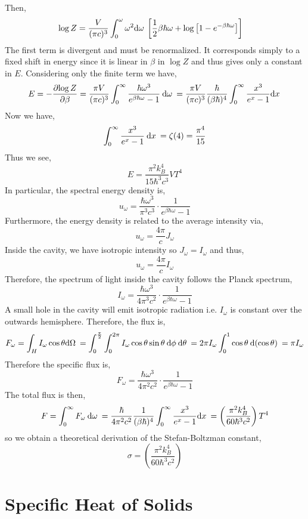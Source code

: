 \documentclass[12pt]{article}
\begin{document}
Then,
\begin{align*}
\log{Z} & = \frac{V}{(\pi c)^3} \int_0^\omega \omega^2 \mathrm{d}\omega \: \left[ \frac{1}{2} \beta \hbar \omega + \log{\left[1 - e^{-\beta \hbar \omega} \right]}  \right]
\end{align*}
The first term is divergent and must be renormalized. It corresponds simply to a fixed shift in energy since it is linear in $\beta$ in $\log{Z}$ and thus gives only a constant in $E$. Considering only the finite term we have,
\begin{align*}
E = - \frac{\partial{\log{Z}}}{\partial{\beta}} = \frac{\pi V}{(\pi c)^3} \int_0^\infty \frac{\hbar \omega^3 }{e^{\beta \hbar \omega} - 1} \: \mathrm{d}\omega \: = \frac{\pi V}{(\pi c)^3} \frac{\hbar}{(\beta \hbar)^4} \int_0^\infty \frac{x^3}{e^x - 1} \mathrm{d}x \: 
\end{align*}
Now we have, 
\[ \int_0^\infty \frac{x^3}{e^x - 1} \: \mathrm{d}x \: = \zeta(4) = \frac{\pi^4}{15} \]
Thus we see,
\[ E = \frac{\pi^2 k_B^4}{15 \hbar^3 c^3}  V T^4 \]
In particular, the spectral energy density is,
\[ u_\omega = \frac{\hbar \omega^3}{\pi^3 c^3} \cdot \frac{1}{e^{\beta \hbar \omega} - 1} \]
Furthermore, the energy density is related to the average intensity via,
\[ u_\omega = \frac{4 \pi}{c} J_\omega \]
Inside the cavity, we have isotropic intensity so $J_\omega = I_\omega$ and thus,
\[ u_\omega = \frac{4 \pi}{c} I_\omega \]
Therefore, the spectrum of light inside the cavity follows the Planck spectrum,
\[ I_\omega = \frac{\hbar \omega^3}{4 \pi^3 c^2} \cdot \frac{1}{e^{\beta \hbar \omega} - 1} \]
A small hole in the cavity will emit isotropic radiation i.e. $I_\omega$ is constant over the outwards hemisphere. Therefore, the flux is,
\[ F_\omega = \int_{H} I_\omega \cos{\theta} \mathrm{d}\Omega \: = \int_0^{\frac{\pi}{2}} \int_0^{2 \pi} I_\omega \cos{\theta} \sin{\theta} \: \mathrm{d}\phi \: \mathrm{d}\theta \: = 2 \pi I_\omega \int_0^1 \cos{\theta} \: \mathrm{d}(\cos{\theta}) \: = \pi I_\omega \]
Therefore the specific flux is,
\[ F_\omega = \frac{\hbar \omega^3}{4 \pi^2 c^2} \cdot \frac{1}{e^{\beta \hbar \omega} - 1} \]
The total flux is then,
\[ F = \int_0^\infty F_\omega \: \mathrm{d}\omega \: = \frac{\hbar}{4\pi^2 c^2} \frac{1}{(\beta \hbar)^4} \int_0^\infty \frac{x^3}{e^x - 1} \mathrm{d}x \: = \left( \frac{\pi^2 k_B^4}{60 \hbar^3 c^2} \right)  T^4 \] 
so we obtain a theoretical derivation of the Stefan-Boltzman constant,
\[ \sigma = \left( \frac{\pi^2 k_B^4}{60 \hbar^3 c^2} \right) \]

\section{Specific Heat of Solids}
\end{document}
